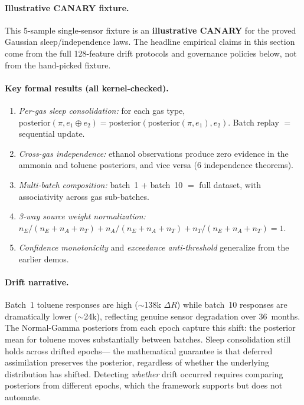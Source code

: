 \documentclass[11pt,openany]{report}
\begin{document}
\paragraph{Illustrative CANARY fixture.}
This 5-sample single-sensor fixture is an \textbf{illustrative CANARY}
for the proved Gaussian sleep/independence laws.  The headline empirical
claims in this section come from the full 128-feature drift protocols
and governance policies below, not from the hand-picked fixture.

\paragraph{Key formal results (all kernel-checked).}
\begin{enumerate}
\item \emph{Per-gas sleep consolidation:} for each gas type,
  $\mathrm{posterior}(\pi, e_1 \oplus e_2)
    = \mathrm{posterior}(\mathrm{posterior}(\pi, e_1), e_2)$.
  Batch replay $=$ sequential update.
\item \emph{Cross-gas independence:} ethanol observations produce
  zero evidence in the ammonia and toluene posteriors, and vice versa
  (6 independence theorems).
\item \emph{Multi-batch composition:} batch~1 $+$ batch~10 $=$
  full dataset, with associativity across gas sub-batches.
\item \emph{3-way source weight normalization:}
  $n_E/(n_E{+}n_A{+}n_T) + n_A/(n_E{+}n_A{+}n_T) + n_T/(n_E{+}n_A{+}n_T) = 1$.
\item \emph{Confidence monotonicity} and \emph{exceedance anti-threshold}
  generalize from the earlier demos.
\end{enumerate}

\paragraph{Drift narrative.}
Batch~1 toluene responses are high ($\sim$138k $\Delta R$) while batch~10
responses are dramatically lower ($\sim$24k), reflecting genuine sensor
degradation over 36~months.  The Normal-Gamma posteriors from each epoch
capture this shift: the posterior mean for toluene moves substantially
between batches.  Sleep consolidation still holds across drifted epochs---
the mathematical guarantee is that deferred assimilation preserves the
posterior, regardless of whether the underlying distribution has shifted.
Detecting \emph{whether} drift occurred requires comparing posteriors
from different epochs, which the framework supports but does not automate.
\end{document}
